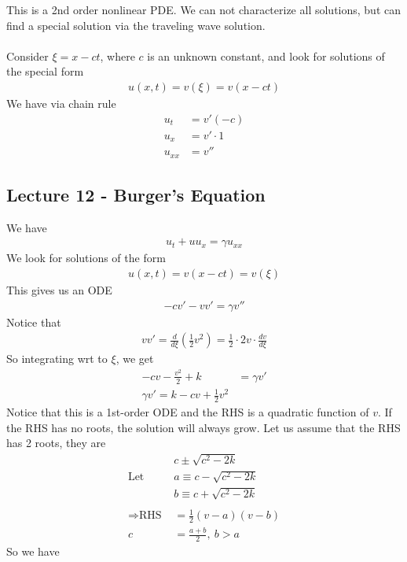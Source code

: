 \documentclass[12pt, letterpaper]{article}
\begin{document}
This is a 2nd order nonlinear PDE. We can not characterize all solutions, but can find a 
special solution via the traveling wave solution. \\ \\ 
Consider $\xi = x - ct$, where $c$ is an unknown constant, and look for solutions of the 
special form 
\begin{align*}
    u(x,t) = v(\xi) = v(x-ct)
\end{align*}
We have via chain rule
\begin{align*}
    u_t &= v'(-c) \\
    u_x &= v'\cdot 1 \\
    u_{xx} &= v''
\end{align*}
\subsection{Lecture 12 - Burger's Equation}
We have 
\begin{align*}
    u_t + uu_x = \gamma u_{xx}
\end{align*}
We look for solutions of the form 
\begin{align*}
    u(x,t) = v(x-ct) = v(\xi)
\end{align*}
This gives us an ODE
\begin{align*}
    -cv' - vv' = \gamma v''
\end{align*}
Notice that 
\begin{align*}
    vv' = \frac{d}{d\xi}(\frac 12 v^2) = \frac 12 \cdot 2v \cdot \frac{dv}{d\xi}
\end{align*}
So integrating wrt to $\xi$, we get 
\begin{align*}
    -cv - \frac{v^2}{2} + k &= \gamma v' \\
    \gamma v' = k-cv + \frac 12 v^2
\end{align*}
Notice that this is a 1st-order ODE and the RHS is a quadratic function of $v$. If the RHS has no 
roots, the solution will always grow. Let us assume that the RHS has 2 roots, they are 
\begin{align*}
    &c \pm \sqrt{c^2 - 2k} \\
    \text{Let }\ & a \equiv c - \sqrt{c^2 - 2k} \\
    & b \equiv c + \sqrt{c^2 - 2k} \\ \\
    \Rightarrow \text{RHS } &= \frac 12 (v-a)(v-b) \\
    c &= \frac{a+b}{2},\ b > a 
\end{align*}
So we have 
\end{document}
